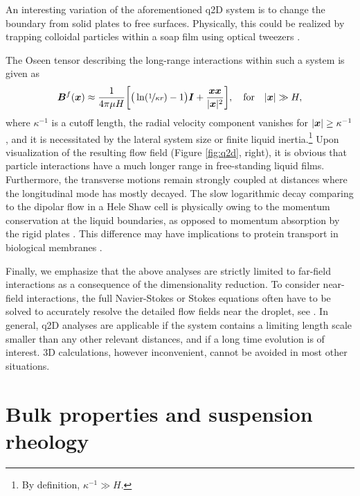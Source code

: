 \medskip
An interesting variation of the aforementioned q2D system is to change the boundary from solid plates to free surfaces. Physically, this could be realized by trapping colloidal particles within a soap film using optical tweezers \citep{Leonardo_etal_2008}.

The Oseen tensor describing the long-range interactions within such a system is given as \citep{Leonardo_etal_2008, Diamant}
\begin{equation}
 \begin{aligned}
   {\bm B}^f({\bm x}) \approx \frac{1}{4\pi\mu H} \bigg[ \big( \ln(\nicefrac{1}{\kappa r}) -1 \big) {\bm I} +\frac{{\bm x}{\bm x} }{ \lvert{\bm x}\rvert^2} \bigg],
   \quad \textrm{for} \quad \lvert\bm x\rvert \gg H,
 \end{aligned}
\end{equation}
where $\kappa^{-1}$ is a cutoff length, \ie the radial velocity component vanishes for $\lvert\bm x\rvert \geq \kappa^{-1}$, and it is necessitated by the lateral system size or finite liquid inertia.\footnote{By definition, $\kappa^{-1} \gg H$.}
Upon visualization of the resulting flow field (Figure \ref{fig:q2d}, right), it is obvious that particle interactions have a much longer range in free-standing liquid films. Furthermore, the transverse motions remain strongly coupled at distances where the longitudinal mode has mostly decayed.
The slow logarithmic decay comparing to the dipolar flow in a Hele Shaw cell is physically owing to the momentum conservation at the liquid boundaries, as opposed to momentum absorption by the rigid plates \citep{Diamant}.
This difference may have implications to protein transport in biological membranes \citep{Saffman3111}.

\medskip
Finally, we emphasize that the above analyses are strictly limited to far-field interactions as a consequence of the dimensionality reduction.
To consider near-field interactions, the full Navier-Stokes or Stokes equations often have to be solved to accurately resolve the detailed flow fields near the droplet, see \eg \cite{zhu_gallaire_2016, flow-assist}. 
In general, q2D analyses are applicable if the system contains a limiting length scale smaller than any other relevant distances, and if a long time evolution is of interest.
3D calculations, however inconvenient, cannot be avoided in most other situations.


\section{Bulk properties and suspension rheology}
\label{sec:sus-rheo}

